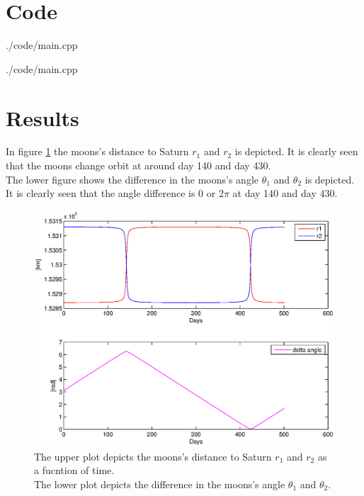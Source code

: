 \section{Code}


{./code/main.cpp}
\quad


{./code/main.cpp}


\section{Results}

In figure \ref{fig:} the moons's distance to Saturn $r_1$ and $r_2$ is depicted. It is clearly seen that the moons change orbit at around day 140 and day 430. \\
The lower figure shows the difference in the moons's angle $\theta_1$ and $\theta_2$ is depicted. It is clearly seen that the angle difference is $0$ or $2\pi$ at day 140 and day 430. 

\begin{figure}[h!]
\centering
\includegraphics[width=1\textwidth]{./graphics/subplot.eps}
\caption[tekst i indholdsfortegnelsen]{The upper plot depicts the moons's distance to Saturn $r_1$ and $r_2$ as a fucntion of time.\\
The lower plot depicts the difference in the moons's angle $\theta_1$ and $\theta_2$.}
\label{fig:}
\end{figure}

